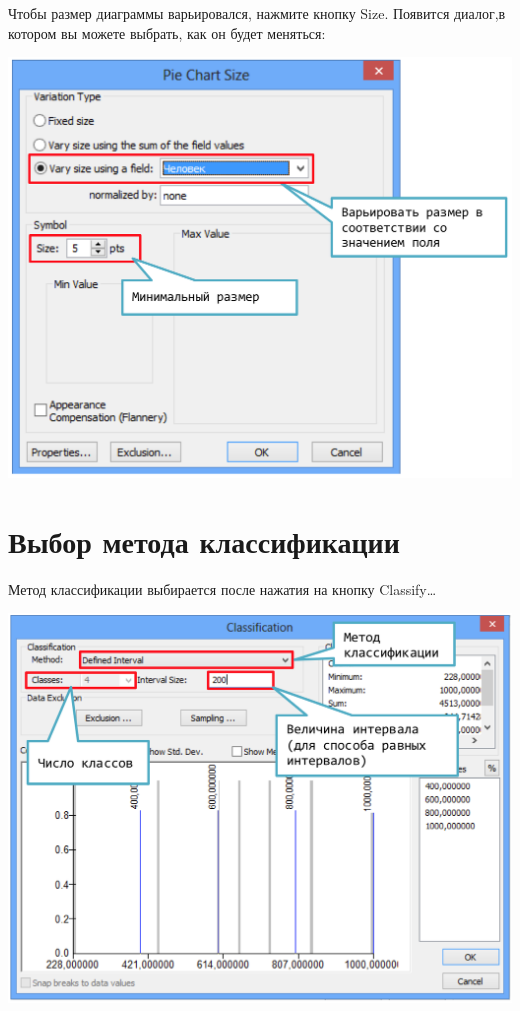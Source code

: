 \documentclass[]{book}
\theoremstyle{definition}
\theoremstyle{definition}
\theoremstyle{definition}
\theoremstyle{remark}
\begin{document}
Чтобы размер диаграммы варьировался, нажмите кнопку Size. Появится
диалог,в котором вы можете выбрать, как он будет меняться:

\includegraphics{images/Appendix/image23.png}

\hypertarget{manual-vector-classes}{%
\section{Выбор метода классификации}\label{manual-vector-classes}}

Метод классификации выбирается после нажатия на кнопку Classify\ldots{}

\includegraphics{images/Appendix/image24.png}
\end{document}
